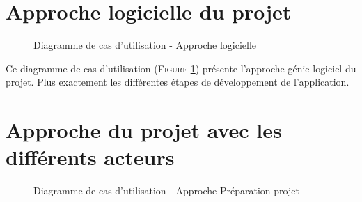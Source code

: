 \documentclass[a4paper,twoside,10pt]{report}
\begin{document}
\section{Approche logicielle du projet}

  \begin{figure}[h]
  \begin{center}
   \caption{Diagramme de cas d'utilisation - Approche logicielle}
   \label{diaglog} 
  \end{center}
  \end{figure}
  
  Ce diagramme de cas d'utilisation (\textsc{Figure} \ref{diaglog}) présente l'approche génie logiciel du projet. Plus exactement les différentes étapes de développement de l'application.
  
\section{Approche du projet avec les différents acteurs}

  \begin{figure}[h]
  \begin{center}
   \caption{Diagramme de cas d'utilisation - Approche Préparation projet}
   \label{diagact} 
  \end{center}
  \end{figure}
  
\end{document}
